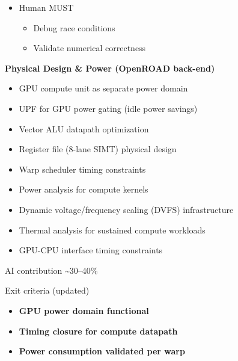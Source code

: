\begin{record}
\begin{itemize}
  \begin{itemize}
  \tightlist
  \item
    Generate kernel tests
  \item
    Build comparison harness
  \end{itemize}
\item
  Human MUST

  \begin{itemize}
  \tightlist
  \item
    Debug race conditions
  \item
    Validate numerical correctness
  \end{itemize}
\end{itemize}

\textbf{Physical Design \& Power (OpenROAD back-end)}

\begin{itemize}
\tightlist
\item
  GPU compute unit as separate power domain
\item
  UPF for GPU power gating (idle power savings)
\item
  Vector ALU datapath optimization
\item
  Register file (8-lane SIMT) physical design
\item
  Warp scheduler timing constraints
\item
  Power analysis for compute kernels
\item
  Dynamic voltage/\allowbreak{}frequency scaling (DVFS) infrastructure
\item
  Thermal analysis for sustained compute workloads
\item
  GPU-CPU interface timing constraints
\end{itemize}

\notemark{} AI contribution \textasciitilde30--40\%

\ok{} Exit criteria (updated)

\begin{itemize}
\tightlist
\item
  \textbf{GPU power domain functional}
\item
  \textbf{Timing closure for compute datapath}
\item
  \textbf{Power consumption validated per warp}
\end{itemize}

\end{record}

